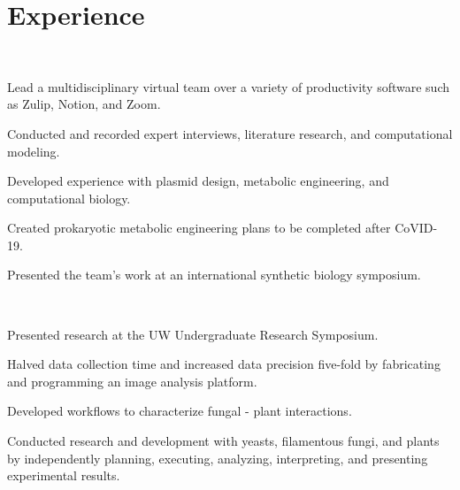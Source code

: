 \documentclass[]{forrest-resume-interfont}
\begin{document}
\section{ Experience}
\\

\begin{tightemize}
    \item Lead a multidisciplinary virtual team over a variety of productivity software such as Zulip,
Notion, and Zoom.
    \item Conducted and recorded expert interviews, literature research, and computational modeling.
    \item Developed experience with plasmid design, metabolic engineering, and computational biology.
    \item Created prokaryotic metabolic engineering plans to be completed after CoVID-19.
    \item Presented the team's work at an international synthetic biology symposium.
\end{tightemize}


\sectionsep


\\

\begin{tightemize}
    \item Presented research at the UW Undergraduate Research Symposium.
    \item Halved data collection time and increased data precision five-fold by fabricating and programming an image analysis platform.
    \item Developed workflows to characterize fungal - plant interactions.
    \item Conducted research and development with yeasts, filamentous fungi, and plants by independently planning, executing, analyzing, interpreting, and presenting experimental results. 
\end{tightemize}

\end{document}
